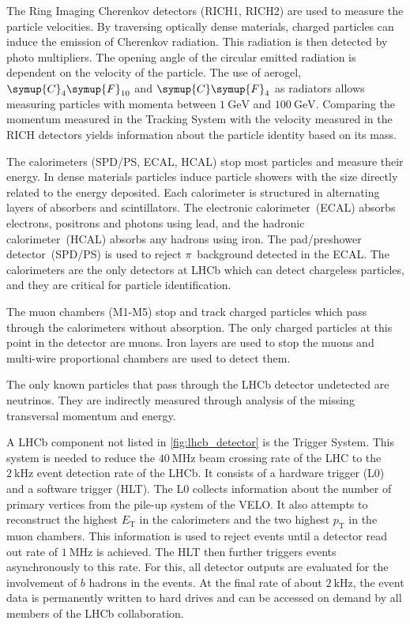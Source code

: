 The Ring Imaging Cherenkov detectors (RICH1, RICH2) are used to measure the particle velocities.
By traversing optically dense materials, charged particles can induce the emission of Cherenkov radiation.
This radiation is then detected by photo multipliers. 
The opening angle of the circular emitted radiation is dependent on the velocity of the particle. 
The use of aerogel, $\symup{C}_4\symup{F}_{10}$ and $\symup{C}\symup{F}_4$ as radiators allows measuring particles with momenta between $\qty{1}{\GeV}$ and $\qty{100}{\GeV}$.
Comparing the momentum measured in the Tracking System with the velocity measured in the RICH detectors yields information about the particle identity based on its mass. 

The calorimeters (SPD/PS, ECAL, HCAL) stop most particles and measure their energy.
In dense materials particles induce particle showers with the size directly related to the energy deposited.
Each calorimeter is structured in alternating layers of absorbers and scintillators. 
The electronic calorimeter~(ECAL) absorbs electrons, positrons and photons using lead, and the hadronic calorimeter~(HCAL) absorbs any hadrons using iron.
The pad/preshower detector~(SPD/PS) is used to reject $\pi$~background detected in the ECAL.
The calorimeters are the only detectors at LHCb which can detect chargeless particles, and they are critical for particle identification.

The muon chambers (M1-M5) stop and track charged particles which pass through the calorimeters without absorption.
The only charged particles at this point in the detector are muons.
Iron layers are used to stop the muons and multi-wire proportional chambers  are used to detect them.

The only known particles that pass through the LHCb detector undetected are neutrinos.
They are indirectly measured through analysis of the missing transversal momentum and energy. 

A LHCb component not listed in \autoref{fig:lhcb_detector} is the Trigger System.
This system is needed to reduce the $\qty{40}{\MHz}$ beam crossing rate of the LHC to the $\qty{2}{\kHz}$ event detection rate of the LHCb. 
It consists of a hardware trigger (L0) and a software trigger (HLT).
The L0 collects information about the number of primary vertices from the pile-up system of the VELO.
It also attempts to reconstruct the highest $E_\text{T}$ in the calorimeters and the two highest $p_\text{T}$ in the muon chambers. 
This information is used to reject events until a detector read out rate of $\qty{1}{\MHz}$ is achieved.
The HLT then further triggers events asynchronously to this rate. 
For this, all detector outputs are evaluated for the involvement of $b$ hadrons in the events.
At the final rate of about $\qty{2}{\kHz}$, the event data is permanently written to hard drives and can be accessed on demand by all members of the LHCb collaboration.

